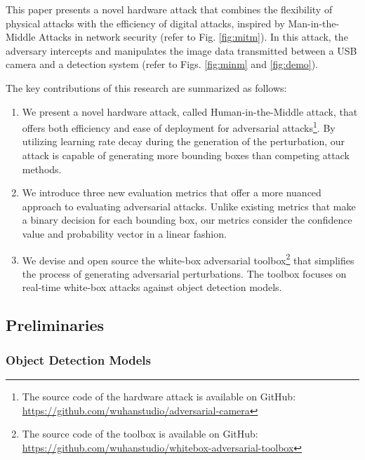 This paper presents a novel hardware attack that combines the flexibility of physical attacks with the efficiency of digital attacks, inspired by Man-in-the-Middle Attacks in network security (refer to Fig. \ref{fig:mitm}). In this attack, the adversary intercepts and manipulates the image data transmitted between a USB camera and a detection system (refer to Figs. \ref{fig:minm} and \ref{fig:demo}). 

The key contributions of this research are summarized as follows:

\begin{enumerate}
    \item We present a novel hardware attack, called Human-in-the-Middle  attack, that offers both efficiency and ease of deployment for adversarial attacks\footnote{The source code of the hardware attack is available on GitHub: \url{https://github.com/wuhanstudio/adversarial-camera}}. By utilizing learning rate decay during the generation of the perturbation, our attack is capable of generating more bounding boxes than competing attack methods.
    \item We introduce three new evaluation metrics that offer a more nuanced approach to evaluating adversarial attacks. Unlike existing metrics that make a binary decision for each bounding box, our metrics consider the confidence value and probability vector in a linear fashion.
    \item We devise and open source the white-box adversarial toolbox\footnote{The source code of the toolbox is available on GitHub: \url{https://github.com/wuhanstudio/whitebox-adversarial-toolbox}} that simplifies the process of generating adversarial perturbations. The toolbox focuses on real-time white-box attacks against object detection models.
\end{enumerate}


\subsection{Preliminaries}


\subsubsection{Object Detection Models}


